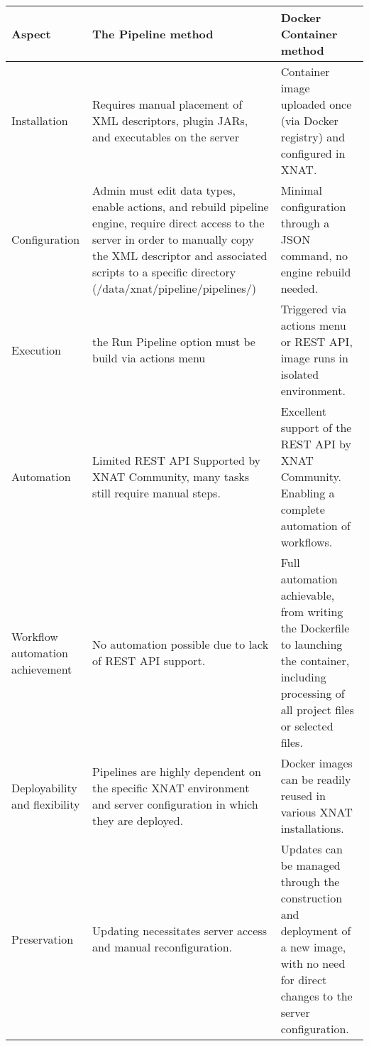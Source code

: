 \begin{table}[H]
    \centering
      \begin{tabular}{|>{\centering\arraybackslash}p{4cm}|
                    >{\centering\arraybackslash}p{5cm}|
                    >{\centering\arraybackslash}p{5cm}|}
    \hline
    \textbf{Aspect} & \textbf{The Pipeline method} & \textbf{Docker Container method}\\ \hline
     Installation & Requires manual placement of XML descriptors, plugin JARs, and executables on the server& Container image uploaded once (via Docker registry) and configured in XNAT. \\ \hline
    Configuration & Admin must edit data types, enable actions, and rebuild pipeline engine, require direct access to the server in order to manually copy the XML
descriptor and associated scripts to a specific directory (/data/xnat/pipeline/pipelines/)& Minimal configuration through a JSON command, no engine rebuild needed. \\ \hline
Execution & the Run Pipeline option must be build via actions menu  & Triggered via actions menu or REST API, image runs in isolated environment. \\ \hline
Automation & Limited REST API Supported by XNAT Community, many tasks still require manual steps.& Excellent support of the REST API by XNAT Community. Enabling a complete automation of workflows. \\ \hline

Workflow automation achievement & No automation possible due to lack of REST API support. & Full automation achievable, from writing the Dockerfile to launching the container, including processing of all project files or selected files. \\ \hline

Deployability and flexibility & Pipelines are highly dependent on the specific XNAT environment and server configuration in which they are deployed. & Docker images can be readily reused in various XNAT installations.\\ \hline
Preservation & Updating necessitates server access and manual reconfiguration.& Updates can be managed through the construction and deployment of a new image, with no need for direct changes to the server configuration.\\ \hline


\end{tabular}
\end{table}
